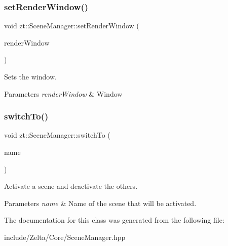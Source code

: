 \subsubsection{\texorpdfstring{set\+Render\+Window()}{setRenderWindow()}}
{\footnotesize\ttfamily void zt\+::\+Scene\+Manager\+::set\+Render\+Window (\begin{DoxyParamCaption}\item[{sf\+::\+Render\+Window \&}]{render\+Window }\end{DoxyParamCaption})}



Sets the window. 


\begin{DoxyParams}{Parameters}
{\em render\+Window} & Window \\
\hline
\end{DoxyParams}
\mbox{\label{classzt_1_1_scene_manager_a90a6e2b62f58123056dd3d475cb64165}} 
\subsubsection{\texorpdfstring{switch\+To()}{switchTo()}}
{\footnotesize\ttfamily void zt\+::\+Scene\+Manager\+::switch\+To (\begin{DoxyParamCaption}\item[{std\+::string}]{name }\end{DoxyParamCaption})}



Activate a scene and deactivate the others. 


\begin{DoxyParams}{Parameters}
{\em name} & Name of the scene that will be activated. \\
\hline
\end{DoxyParams}


The documentation for this class was generated from the following file\+:\begin{DoxyCompactItemize}
\item 
include/\+Zelta/\+Core/Scene\+Manager.\+hpp\end{DoxyCompactItemize}
